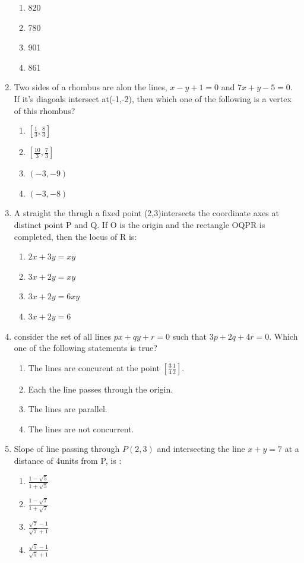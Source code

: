 \documentclass[12pt]{article}
\begin{document}
\begin{enumerate}
\begin{enumerate}
\item 820 
\item 780 
\item 901 
\item 861\\
\end{enumerate}
\item  Two sides  of a rhombus are alon the lines, $x-y+1=0$ and $7x+y-5=0$. If it's diagoals intersect at(-1,-2), then which one of the following is a vertex of this rhombus?
\begin{enumerate}
\item $\left[ \frac{1}{3},\frac{8}{3}\right]$ 
\item $\left[ \frac{10}{3},\frac{7}{3}\right]$ 
\item $(-3,-9)$ 
\item $(-3,-8)$
\end{enumerate}
\item   A straight the thrugh a fixed point (2,3)intersects the coordinate axes at distinct point P  and Q. If O is the origin and the rectangle OQPR is completed, then the locus of R is:
\begin{enumerate}
\item $2x+3y=xy$ 
\item $3x+2y=xy$ 
\item $3x+2y=6xy$ 
\item $3x+2y=6$
\end{enumerate}
\item  consider the set of all lines $px+qy+r=0$ such that $3p+2q+4r=0$. Which one of the following statements is true?
\begin{enumerate}
\item The lines are concurent at the point $\left[ \frac{3}{4}\frac{1}{2}\right] $.\\
\item Each the line passes through the origin.\\
\item The lines are parallel.\\
\item The lines are not concurrent.\\
\end{enumerate}
\item  Slope of line passing through $P(2,3)$ and intersecting the line $x+y=7$ at a distance of 4units from  P,  is :
\begin{enumerate}
\item $\frac{1-\sqrt{5}}{1+\sqrt{5}}$
\item $\frac{1-\sqrt{7}}{1+\sqrt{7}}$
\item $\frac{\sqrt{7}-1}{\sqrt{7}+1}$
\item$\frac{\sqrt{5}-1}{\sqrt{5}+1}$
\end{enumerate}
\end{enumerate}
\end{document}
